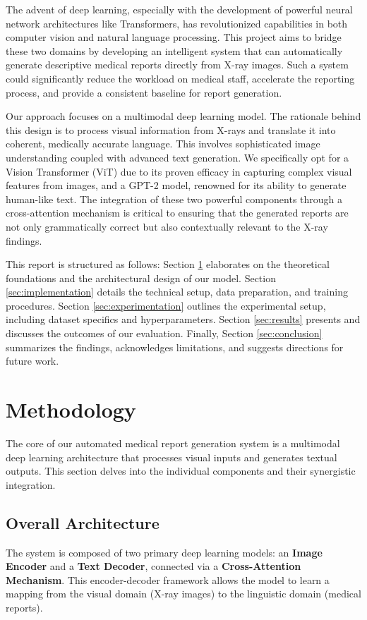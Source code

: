 \documentclass[a4paper, 12pt]{article}
\begin{document}
The advent of deep learning, especially with the development of powerful neural network architectures like Transformers, has revolutionized capabilities in both computer vision and natural language processing. This project aims to bridge these two domains by developing an intelligent system that can automatically generate descriptive medical reports directly from X-ray images. Such a system could significantly reduce the workload on medical staff, accelerate the reporting process, and provide a consistent baseline for report generation.

Our approach focuses on a multimodal deep learning model. The rationale behind this design is to process visual information from X-rays and translate it into coherent, medically accurate language. This involves sophisticated image understanding coupled with advanced text generation. We specifically opt for a Vision Transformer (ViT) due to its proven efficacy in capturing complex visual features from images, and a GPT-2 model, renowned for its ability to generate human-like text. The integration of these two powerful components through a cross-attention mechanism is critical to ensuring that the generated reports are not only grammatically correct but also contextually relevant to the X-ray findings.

This report is structured as follows: Section \ref{sec:methodology} elaborates on the theoretical foundations and the architectural design of our model. Section \ref{sec:implementation} details the technical setup, data preparation, and training procedures. Section \ref{sec:experimentation} outlines the experimental setup, including dataset specifics and hyperparameters. Section \ref{sec:results} presents and discusses the outcomes of our evaluation. Finally, Section \ref{sec:conclusion} summarizes the findings, acknowledges limitations, and suggests directions for future work.

\section{Methodology}
\label{sec:methodology}

The core of our automated medical report generation system is a multimodal deep learning architecture that processes visual inputs and generates textual outputs. This section delves into the individual components and their synergistic integration.

\subsection{Overall Architecture}
The system is composed of two primary deep learning models: an \textbf{Image Encoder} and a \textbf{Text Decoder}, connected via a \textbf{Cross-Attention Mechanism}. This encoder-decoder framework allows the model to learn a mapping from the visual domain (X-ray images) to the linguistic domain (medical reports).
\end{document}
